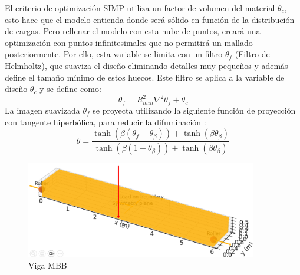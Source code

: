\documentclass{article}
\theoremstyle{mytheoremstyle}
\theoremstyle{mytheoremstyle}
\theoremstyle{myproblemstyle}
\begin{document}
       El criterio de optimización SIMP utiliza un factor de volumen del material $\theta_c$, esto hace que el modelo entienda donde será sólido en función de la distribución de cargas. Pero rellenar el modelo con esta nube de puntos, creará una optimización con puntos infinitesimales que no permitirá un mallado posteriormente. Por ello, esta variable se limita con un filtro $\theta_f$ (Filtro de Helmholtz), que suaviza el diseño eliminando detalles muy pequeños y además define el tamaño mínimo de estos huecos. Este filtro se aplica a la variable de diseño $\theta_c$ y se define como: 
        \begin{equation}
                \theta_f = R_{min}^2 \nabla^2 \theta_f + \theta_c
                \label{eq:filtro_helmholtz}
             \end{equation}
             La imagen suavizada $\theta_f$ se proyecta utilizando la siguiente función de proyección con tangente hiperbólica, para reducir la difuminación :
             \begin{equation}
             \theta = \frac{\tanh(\beta(\theta_f - \theta_\beta)) + \tanh(\beta\theta_\beta)}{\tanh(\beta(1 - \theta_\beta)) + \tanh(\beta\theta_\beta)}
             \end{equation}
            \begin{figure}[H]
              \centering
              \includegraphics[width=0.9\textwidth]{2.png}
              \caption{Viga MBB}
              \label{fig:imagen_x}
            \end{figure}
\end{document}
